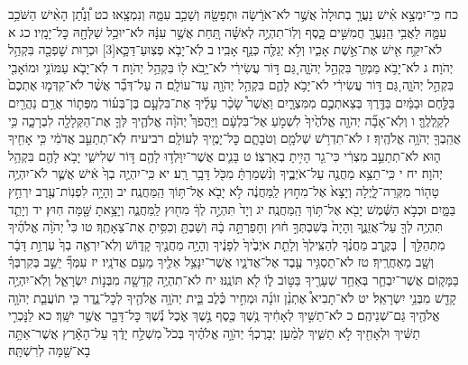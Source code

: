 \documentclass[twoside, openany, parskip=half, 11pt]{book}
\begin{document}
כח כִּֽי־יִמְצָ֣א אִ֗ישׁ נַעֲרָ֤ בְתוּלָה֙ אֲשֶׁ֣ר לֹא־אֹרָ֔שָׂה וּתְפָשָׂ֖הּ וְשָׁכַ֣ב עִמָּ֑הּ וְנִמְצָֽאוּ׃ כט וְ֠נָתַ֠ן הָאִ֨ישׁ הַשֹּׁכֵ֥ב עִמָּ֛הּ לַאֲבִ֥י הַֽנַּעֲרָ֖ חֲמִשִּׁ֣ים כָּ֑סֶף וְלֽוֹ־תִהְיֶ֣ה לְאִשָּׁ֗ה תַּ֚חַת אֲשֶׁ֣ר עִנָּ֔הּ לֹא־יוּכַ֥ל שַׁלְּחָ֖הּ כׇּל־יָמָֽיו׃
כג א לֹא־יִקַּ֥ח אִ֖ישׁ אֶת־אֵ֣שֶׁת אָבִ֑יו וְלֹ֥א יְגַלֶּ֖ה כְּנַ֥ף אָבִֽיו׃
ב לֹֽא־יָבֹ֧א פְצֽוּעַ־דַּכָּ֛א‏[3] וּכְר֥וּת שׇׁפְכָ֖ה בִּקְהַ֥ל יְהֹוָה׃
ג לֹא־יָבֹ֥א מַמְזֵ֖ר בִּקְהַ֣ל יְהֹוָ֑ה גַּ֚ם דּ֣וֹר עֲשִׂירִ֔י לֹא־יָ֥בֹא ל֖וֹ בִּקְהַ֥ל יְהֹוָה׃
ד לֹֽא־יָבֹ֧א עַמּוֹנִ֛י וּמוֹאָבִ֖י בִּקְהַ֣ל יְהֹוָ֑ה גַּ֚ם דּ֣וֹר עֲשִׂירִ֔י לֹא־יָבֹ֥א לָהֶ֛ם בִּקְהַ֥ל יְהֹוָ֖ה עַד־עוֹלָֽם׃ ה עַל־דְּבַ֞ר אֲשֶׁ֨ר לֹא־קִדְּמ֤וּ אֶתְכֶם֙ בַּלֶּ֣חֶם וּבַמַּ֔יִם בַּדֶּ֖רֶךְ בְּצֵאתְכֶ֣ם מִמִּצְרָ֑יִם וַאֲשֶׁר֩ שָׂכַ֨ר עָלֶ֜יךָ אֶת־בִּלְעָ֣ם בֶּן־בְּע֗וֹר מִפְּת֛וֹר אֲרַ֥ם נַהֲרַ֖יִם לְקַֽלְלֶֽךָּ׃ ו וְלֹֽא־אָבָ֞ה יְהֹוָ֤ה אֱלֹהֶ֙יךָ֙ לִשְׁמֹ֣עַ אֶל־בִּלְעָ֔ם וַיַּהֲפֹךְ֩ יְהֹוָ֨ה אֱלֹהֶ֧יךָ לְּךָ֛ אֶת־הַקְּלָלָ֖ה לִבְרָכָ֑ה כִּ֥י אֲהֵֽבְךָ֖ יְהֹוָ֥ה אֱלֹהֶֽיךָ׃ ז לֹא־תִדְרֹ֥שׁ שְׁלֹמָ֖ם וְטֹבָתָ֑ם כׇּל־יָמֶ֖יךָ לְעוֹלָֽם׃
רביעיח לֹֽא־תְתַעֵ֣ב אֲדֹמִ֔י כִּ֥י אָחִ֖יךָ ה֑וּא לֹא־תְתַעֵ֣ב מִצְרִ֔י כִּי־גֵ֖ר הָיִ֥יתָ בְאַרְצֽוֹ׃ ט בָּנִ֛ים אֲשֶׁר־יִוָּלְד֥וּ לָהֶ֖ם דּ֣וֹר שְׁלִישִׁ֑י יָבֹ֥א לָהֶ֖ם בִּקְהַ֥ל יְהֹוָה׃
יח י כִּֽי־תֵצֵ֥א מַחֲנֶ֖ה עַל־אֹיְבֶ֑יךָ וְנִ֨שְׁמַרְתָּ֔ מִכֹּ֖ל דָּבָ֥ר רָֽע׃ יא כִּֽי־יִהְיֶ֤ה בְךָ֙ אִ֔ישׁ אֲשֶׁ֛ר לֹא־יִהְיֶ֥ה טָה֖וֹר מִקְּרֵה־לָ֑יְלָה וְיָצָא֙ אֶל־מִח֣וּץ לַֽמַּחֲנֶ֔ה לֹ֥א יָבֹ֖א אֶל־תּ֥וֹךְ הַֽמַּחֲנֶֽה׃ יב וְהָיָ֥ה לִפְנֽוֹת־עֶ֖רֶב יִרְחַ֣ץ בַּמָּ֑יִם וּכְבֹ֣א הַשֶּׁ֔מֶשׁ יָבֹ֖א אֶל־תּ֥וֹךְ הַֽמַּחֲנֶֽה׃ יג וְיָד֙ תִּהְיֶ֣ה לְךָ֔ מִח֖וּץ לַֽמַּחֲנֶ֑ה וְיָצָ֥אתָ שָּׁ֖מָּה חֽוּץ׃ יד וְיָתֵ֛ד תִּהְיֶ֥ה לְךָ֖ עַל־אֲזֵנֶ֑ךָ וְהָיָה֙ בְּשִׁבְתְּךָ֣ ח֔וּץ וְחָפַרְתָּ֣ה בָ֔הּ וְשַׁבְתָּ֖ וְכִסִּ֥יתָ אֶת־צֵאָתֶֽךָ׃ טו כִּי֩ יְהֹוָ֨ה אֱלֹהֶ֜יךָ מִתְהַלֵּ֣ךְ ׀ בְּקֶ֣רֶב מַחֲנֶ֗ךָ לְהַצִּֽילְךָ֙ וְלָתֵ֤ת אֹיְבֶ֙יךָ֙ לְפָנֶ֔יךָ וְהָיָ֥ה מַחֲנֶ֖יךָ קָד֑וֹשׁ וְלֹֽא־יִרְאֶ֤ה בְךָ֙ עֶרְוַ֣ת דָּבָ֔ר וְשָׁ֖ב מֵאַחֲרֶֽיךָ׃
טז לֹא־תַסְגִּ֥יר עֶ֖בֶד אֶל־אֲדֹנָ֑יו אֲשֶׁר־יִנָּצֵ֥ל אֵלֶ֖יךָ מֵעִ֥ם אֲדֹנָֽיו׃ יז עִמְּךָ֞ יֵשֵׁ֣ב בְּקִרְבְּךָ֗ בַּמָּק֧וֹם אֲשֶׁר־יִבְחַ֛ר בְּאַחַ֥ד שְׁעָרֶ֖יךָ בַּטּ֣וֹב ל֑וֹ לֹ֖א תּוֹנֶֽנּוּ׃
יח לֹא־תִהְיֶ֥ה קְדֵשָׁ֖ה מִבְּנ֣וֹת יִשְׂרָאֵ֑ל וְלֹֽא־יִהְיֶ֥ה קָדֵ֖שׁ מִבְּנֵ֥י יִשְׂרָאֵֽל׃ יט לֹא־תָבִיא֩ אֶתְנַ֨ן זוֹנָ֜ה וּמְחִ֣יר כֶּ֗לֶב בֵּ֛ית יְהֹוָ֥ה אֱלֹהֶ֖יךָ לְכׇל־נֶ֑דֶר כִּ֧י תוֹעֲבַ֛ת יְהֹוָ֥ה אֱלֹהֶ֖יךָ גַּם־שְׁנֵיהֶֽם׃
כ לֹא־תַשִּׁ֣יךְ לְאָחִ֔יךָ נֶ֥שֶׁךְ כֶּ֖סֶף נֶ֣שֶׁךְ אֹ֑כֶל נֶ֕שֶׁךְ כׇּל־דָּבָ֖ר אֲשֶׁ֥ר יִשָּֽׁךְ׃ כא לַנׇּכְרִ֣י תַשִּׁ֔יךְ וּלְאָחִ֖יךָ לֹ֣א תַשִּׁ֑יךְ לְמַ֨עַן יְבָרֶכְךָ֜ יְהֹוָ֣ה אֱלֹהֶ֗יךָ בְּכֹל֙ מִשְׁלַ֣ח יָדֶ֔ךָ עַל־הָאָ֕רֶץ אֲשֶׁר־אַתָּ֥ה בָא־שָׁ֖מָּה לְרִשְׁתָּֽהּ׃
\end{document}
